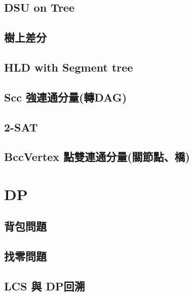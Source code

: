 \subsection{DSU on Tree}


\newpage

\subsection{樹上差分}


\clearpage

\subsection{HLD with Segment tree}


\subsection{Scc 強連通分量(轉DAG)}


\subsection{2-SAT}


\subsection{BccVertex 點雙連通分量(關節點、橋)}


\clearpage

\section{DP}

\subsection{背包問題}


\subsection{找零問題}


\subsection{LCS 與 DP回溯}


